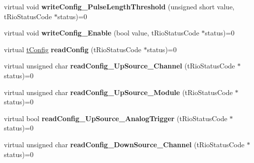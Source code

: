 \begin{DoxyCompactItemize}
\item 
\hypertarget{classnFPGA_1_1nFRC__2012__1__6__4_1_1tCounter_ad5db78701eae135854f0a0038aea883e}{
virtual void {\bfseries writeConfig\_\-PulseLengthThreshold} (unsigned short value, tRioStatusCode $\ast$status)=0}
\label{classnFPGA_1_1nFRC__2012__1__6__4_1_1tCounter_ad5db78701eae135854f0a0038aea883e}

\item 
\hypertarget{classnFPGA_1_1nFRC__2012__1__6__4_1_1tCounter_a9c17303d4e54b1de01b31c98b3286d18}{
virtual void {\bfseries writeConfig\_\-Enable} (bool value, tRioStatusCode $\ast$status)=0}
\label{classnFPGA_1_1nFRC__2012__1__6__4_1_1tCounter_a9c17303d4e54b1de01b31c98b3286d18}

\item 
\hypertarget{classnFPGA_1_1nFRC__2012__1__6__4_1_1tCounter_a16050b23adc7f302ecfa76e6cab45ad9}{
virtual \hyperlink{unionnFPGA_1_1nFRC__2012__1__6__4_1_1tCounter_1_1tConfig}{tConfig} {\bfseries readConfig} (tRioStatusCode $\ast$status)=0}
\label{classnFPGA_1_1nFRC__2012__1__6__4_1_1tCounter_a16050b23adc7f302ecfa76e6cab45ad9}

\item 
\hypertarget{classnFPGA_1_1nFRC__2012__1__6__4_1_1tCounter_a04fd886d283ebb98789505e31e38e2b4}{
virtual unsigned char {\bfseries readConfig\_\-UpSource\_\-Channel} (tRioStatusCode $\ast$status)=0}
\label{classnFPGA_1_1nFRC__2012__1__6__4_1_1tCounter_a04fd886d283ebb98789505e31e38e2b4}

\item 
\hypertarget{classnFPGA_1_1nFRC__2012__1__6__4_1_1tCounter_a33b33855addff82ab215fd3c5f6c3e6d}{
virtual unsigned char {\bfseries readConfig\_\-UpSource\_\-Module} (tRioStatusCode $\ast$status)=0}
\label{classnFPGA_1_1nFRC__2012__1__6__4_1_1tCounter_a33b33855addff82ab215fd3c5f6c3e6d}

\item 
\hypertarget{classnFPGA_1_1nFRC__2012__1__6__4_1_1tCounter_a6d9a0d9cd54102a5ecfc9cbab3a64749}{
virtual bool {\bfseries readConfig\_\-UpSource\_\-AnalogTrigger} (tRioStatusCode $\ast$status)=0}
\label{classnFPGA_1_1nFRC__2012__1__6__4_1_1tCounter_a6d9a0d9cd54102a5ecfc9cbab3a64749}

\item 
\hypertarget{classnFPGA_1_1nFRC__2012__1__6__4_1_1tCounter_a844702f32f51a7cef7c916c2306d0df2}{
virtual unsigned char {\bfseries readConfig\_\-DownSource\_\-Channel} (tRioStatusCode $\ast$status)=0}
\label{classnFPGA_1_1nFRC__2012__1__6__4_1_1tCounter_a844702f32f51a7cef7c916c2306d0df2}


\end{DoxyCompactItemize}
